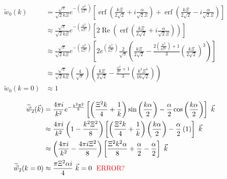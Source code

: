\documentclass[double,12pt]{beavtex}
\begin{document}
\begin{align}
    \widetilde{w}_0(k) &= \frac{\sqrt{\pi}}{\sqrt{2}k\Xi}e^{-\left(\frac{\alpha^2}{2\Xi^2}\right)}\left[\operatorname{erf}
    \left(\frac{k\Xi}{2\sqrt{2}}+i\frac{\alpha}{\sqrt{2}\Xi}\right)
    +\operatorname{erf}\left(\frac{k\Xi}{2\sqrt{2}}-i\frac{\alpha}{\sqrt{2}\Xi}\right)\right] \\
    & \approx   \frac{\sqrt{\pi}}{\sqrt{2}k\Xi}e^{-\left(\frac{\alpha^2}{2\Xi^2}\right)}\left[2\operatorname{Re}\left(\operatorname{erf}\left(\frac{k\Xi}{2\sqrt{2}}+i\frac{\alpha}{\sqrt{2}\Xi}\right)\right)\right]  \\
    & \approx   \frac{\sqrt{\pi}}{\sqrt{2}k\Xi}e^{-\left(\frac{\alpha^2}{2\Xi^2}\right)}\left[2e^{\left(\frac{\alpha^2}{2\Xi^2}\right)}\frac{2}{\sqrt{\pi}}\left(\frac{k\Xi}{2\sqrt{2}} -\frac{2\left(\frac{\alpha^2}{2\Xi^2}\right)+1}{3}\left(\frac{k\Xi}{2\sqrt{2}}\right)^3\right)\right]  \\
    & \approx   \frac{\sqrt{\pi}}{\sqrt{2}k\Xi}\left(\frac{4}{\sqrt{\pi}}\right)\left(\frac{k\Xi}{2\sqrt{2}} -\frac{\frac{\alpha^2}{\Xi^2}+1}{3}\left(\frac{k^3\Xi^3}{16\sqrt{2}}\right)\right) \\
     \widetilde{w}_0(k=0) & \approx 1
\end{align}

\begin{align}
   \widetilde{\vec{w}}_2(\vec{k})&= \frac{4\pi{i}}{k^2}e^{-\frac{k^2\Xi^2}{8}}
   \left[\left(\frac{\Xi^2k}{4}+\frac{1}{k}\right)\sin\left(\frac{k\alpha}{2}\right)
   -\frac{\alpha}{2}\cos\left(\frac{k\alpha}{2}\right)\right]{~}\vec{k}  \\
    & \approx  \frac{4\pi{i}}{k^2}\left(1-\frac{k^2\Xi^2}{8}\right)\left[\left(\frac{\Xi^2k}{4}+\frac{1}{k}\right)\left(\frac{k\alpha}{2}\right)-\frac{\alpha}{2}\left(1\right)\right]{~}\vec{k}\\
    & \approx  \left(\frac{4\pi{i}}{k^2}-\frac{4\pi i\Xi^2}{8}\right)\left[\frac{\Xi^2k^2\alpha}{8}+\frac{\alpha}{2}-\frac{\alpha}{2}\right]{~}\vec{k} \\
    \widetilde{\vec w}_2(k=0) & \approx \frac{\pi\Xi^2\alpha i}{4} {~}\vec{k} = 0\mbox{\textcolor{red}{~~ERROR?}}
\end{align}
\end{document}
